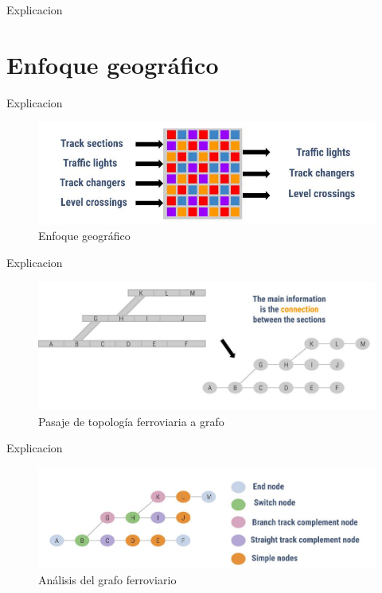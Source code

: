 	Explicacion
			
\section{Enfoque geográfico}

	Explicacion
	
		\begin{figure}[h]
		\centering
			\includegraphics[scale=.55]{./Figures/Geografico}
			\caption{Enfoque geográfico}
			\label{fig:Geografico}
		\end{figure}

	Explicacion
		
		\begin{figure}[h]
		\centering
			\includegraphics[scale=.4]{./Figures/Topologia_grafo}
			\caption{Pasaje de topología ferroviaria a grafo}
			\label{fig:Funcional}
		\end{figure}
	
	Explicacion
	
		\begin{figure}[h]
		\centering
			\includegraphics[scale=.4]{./Figures/Grafo}
			\caption{Análisis del grafo ferroviario}
			\label{fig:Funcional}
		\end{figure}
	
